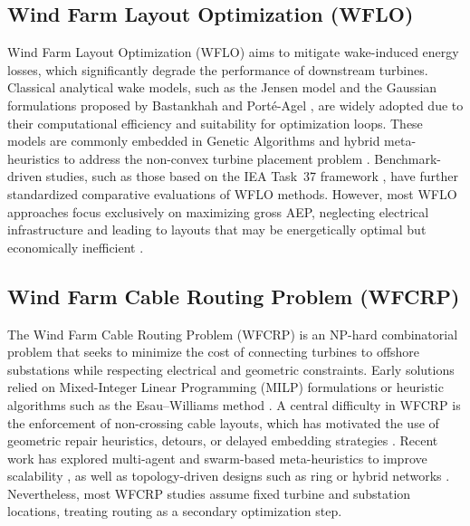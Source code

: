 \documentclass[format=sigconf,anonymous=true,review=true]{acmart}
\begin{document}
\subsection{Wind Farm Layout Optimization (WFLO)}
Wind Farm Layout Optimization (WFLO) aims to mitigate wake-induced energy losses, which significantly degrade the performance of downstream turbines. Classical analytical wake models, such as the Jensen model \cite{Jensen1983Wake, Katic1986Simple} and the Gaussian formulations proposed by Bastankhah and Porté-Agel \cite{Bastankhah2014Gaussian, Bastankhah2016Gaussian}, are widely adopted due to their computational efficiency and suitability for optimization loops. These models are commonly embedded in Genetic Algorithms and hybrid meta-heuristics to address the non-convex turbine placement problem \cite{Haupt2004, Qureshi2023Hybrid}. Benchmark-driven studies, such as those based on the IEA Task~37 framework \cite{Baker2019Best}, have further standardized comparative evaluations of WFLO methods. However, most WFLO approaches focus exclusively on maximizing gross AEP, neglecting electrical infrastructure and leading to layouts that may be energetically optimal but economically inefficient \cite{Silva2025Layout}.

\subsection{Wind Farm Cable Routing Problem (WFCRP)}
The Wind Farm Cable Routing Problem (WFCRP) is an NP-hard combinatorial problem that seeks to minimize the cost of connecting turbines to offshore substations while respecting electrical and geometric constraints. Early solutions relied on Mixed-Integer Linear Programming (MILP) formulations \cite{Fischetti2015MILP} or heuristic algorithms such as the Esau--Williams method \cite{Jiangyi2025Topology}. A central difficulty in WFCRP is the enforcement of non-crossing cable layouts, which has motivated the use of geometric repair heuristics, detours, or delayed embedding strategies \cite{Alencar2026Flexible, Ye2023Path}. Recent work has explored multi-agent and swarm-based meta-heuristics to improve scalability \cite{Machado2024Hybrid, Yuan2025ACO}, as well as topology-driven designs such as ring or hybrid networks \cite{Shen2023Ring}. Nevertheless, most WFCRP studies assume fixed turbine and substation locations, treating routing as a secondary optimization step.
\end{document}

